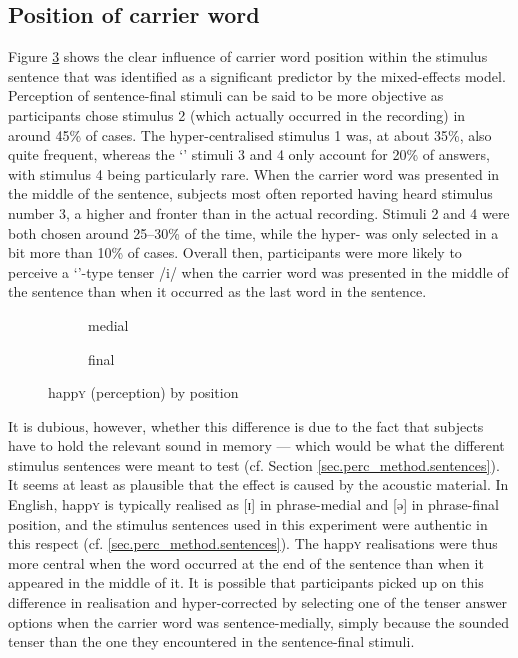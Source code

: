 \subsection{Position of carrier word}
\label{sec.perc_res.happy.position}

Figure \ref{fig.bar.happy.tot.ext.pos} shows the clear influence of carrier word position within the stimulus sentence that was identified as a significant predictor by the mixed-effects model.
Perception of sentence-final stimuli can be said to be more objective as participants chose stimulus 2 (which actually occurred in the recording) in around 45\% of cases.
The hyper-centralised stimulus 1 was, at about 35\%, also quite frequent, whereas the `' stimuli 3 and 4 only account for 20\% of answers, with stimulus 4 being particularly rare.
When the carrier word was presented in the middle of the sentence, subjects most often reported having heard stimulus number 3, a  higher and fronter than in the actual recording.
Stimuli 2 and 4 were both chosen around 25--30\% of the time, while the hyper-  was only selected in a bit more than 10\% of cases.
Overall then, participants were more likely to perceive a `'-type tenser /i/ when the carrier word was presented in the middle of the sentence than when it occurred as the last word in the sentence.

\begin{figure}[h]
	\centering
	\begin{subfigure}{0.49\textwidth}
		\centering
			\resizebox{\linewidth}{!}{} 
		\caption{medial}
		\label{fig.bar.happy.tot.ext.med}
	\end{subfigure}
	\begin{subfigure}{0.49\textwidth}
		\centering
			\resizebox{\linewidth}{!}{} 
		\caption{final}
		\label{fig.bar.happy.tot.ext.fin}
	\end{subfigure}
	\caption{happ\textsc{y} (perception) by position}
	\label{fig.bar.happy.tot.ext.pos}
\end{figure}

It is dubious, however, whether this difference is due to the fact that subjects have to hold the relevant sound in memory --- which would be what the different stimulus sentences were meant to test (cf. Section \ref{sec.perc_method.sentences}).
It seems at least as plausible that the effect is caused by the acoustic material.
In  English, happ\textsc{y} is typically realised as [ɪ] in phrase-medial and [ə] in phrase-final position, and the stimulus sentences used in this experiment were authentic in this respect (cf. \ref{sec.perc_method.sentences}).
The happ\textsc{y} realisations were thus more central when the word occurred at the end of the sentence than when it appeared in the middle of it.
It is possible that participants picked up on this difference in realisation and hyper-corrected by selecting one of the tenser answer options when the carrier word was sentence-medially, simply because the  sounded tenser than the one they encountered in the sentence-final stimuli.

